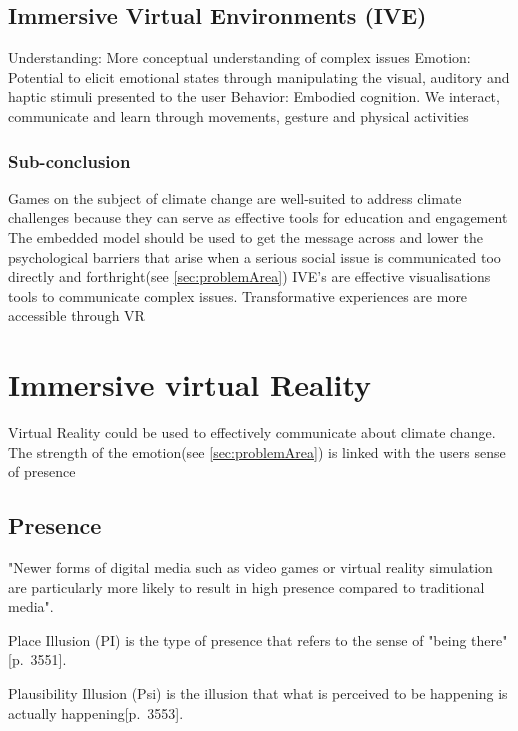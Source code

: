     \subsection{Immersive Virtual Environments (IVE)}
    Understanding: More conceptual understanding of complex issues\cite{vrEngagementClimateChange}
    Emotion: Potential to elicit emotional states through manipulating the visual, auditory and haptic stimuli presented to the user
    Behavior: Embodied cognition. We interact, communicate and learn through movements, gesture and physical activities

    
    \subsubsection{Sub-conclusion}
    Games on the subject of climate change are well-suited to address climate challenges because they can serve as effective tools for education and engagement\cite{gamesAsToolsForEngagement}
    The embedded model should be used to get the message across and lower the psychological barriers that arise when a serious social issue is communicated too directly and forthright(see \autoref{sec:problemArea})
    IVE's are effective visualisations tools to communicate complex issues.
    Transformative experiences are more accessible through VR


\section{Immersive virtual Reality}
    Virtual Reality could be used to effectively communicate about climate change. 
    The strength of the emotion(see \autoref{sec:problemArea}) is linked with the users sense of presence\cite{vrEngagementClimateChange}
    
    \subsection{Presence}
    "Newer forms of digital media such as video games or virtual reality simulation are particularly more likely to result in high presence compared to traditional media"\cite{ahn2011embodied}.
    
    Place Illusion (PI) is the type of presence that refers to the sense of "being there"\citep{vrImmersion}[p.~3551].
    
    Plausibility Illusion (Psi) is the illusion that what is perceived to be happening is actually happening\citep{vrImmersion}[p.~3553].
    
